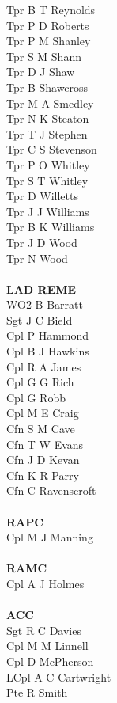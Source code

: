 \begin{multicols}{2}
  Tpr B T Reynolds \\
  Tpr P D Roberts \\
  Tpr P M Shanley \\
  Tpr S M Shann \\
  Tpr D J Shaw \\
  Tpr B Shawcross \\
  Tpr M A Smedley \\
  Tpr N K Steaton \\
  Tpr T J Stephen \\
  Tpr C S Stevenson \\
  Tpr P O Whitley \\
  Tpr S T Whitley \\
  Tpr D Willetts \\
  Tpr J J Williams \\
  Tpr B K Williams \\
  Tpr J D Wood \\
  Tpr N Wood \\
  \\
  \textbf{LAD REME} \\
  WO2 B Barratt \\
  Sgt J C Bield \\
  Cpl P Hammond \\
  Cpl B J Hawkins \\
  Cpl R A James \\
  Cpl G G Rich \\
  Cpl G Robb \\
  Cpl M E Craig \\
  Cfn S M Cave \\
  Cfn T W Evans \\
  Cfn J D Kevan \\
  Cfn K R Parry \\
  Cfn C Ravenscroft \\
  \\
  \textbf{RAPC} \\
  Cpl M J Manning \\
  \\
  \textbf{RAMC} \\
  Cpl A J Holmes \\
  \\
  \textbf{ACC} \\
  Sgt R C Davies \\
  Cpl M M Linnell \\
  Cpl D McPherson \\
  LCpl A C Cartwright \\
  Pte R Smith \\
\end{multicols}
